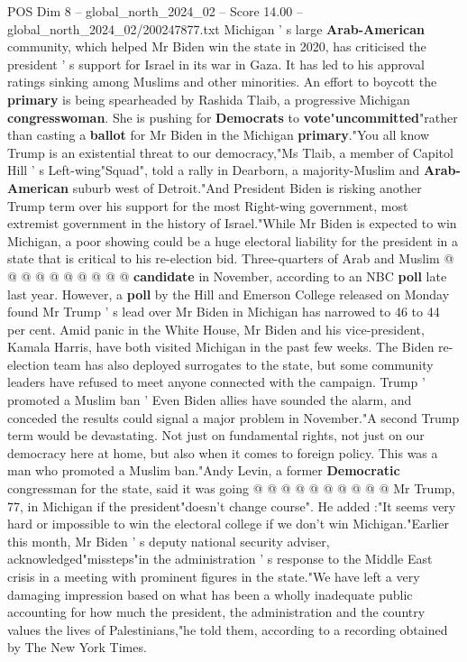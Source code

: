 \begin{textsample}{POS Dim 8 – global\_north\_2024\_02 – Score 14.00 – global\_north\_2024\_02/200247877.txt}  \label{ex:f8_pos_027}
Michigan ' s large \textbf{Arab-American} community, which helped Mr Biden win the state in 2020, has criticised the president ' s support for Israel in its war in Gaza.
It has led to his approval ratings sinking among Muslims and other minorities.
An effort to boycott the \textbf{primary} is being spearheaded by Rashida Tlaib, a progressive Michigan \textbf{congresswoman}.
She is pushing for \textbf{Democrats} to \textbf{vote}"\textbf{uncommitted}"rather than casting a \textbf{ballot} for Mr Biden in the Michigan \textbf{primary}."You all know Trump is an existential threat to our democracy,"Ms Tlaib, a member of Capitol Hill ' s Left-wing"Squad", told a rally in Dearborn, a majority-Muslim and \textbf{Arab-American} suburb west of Detroit."And President Biden is risking another Trump term over his support for the most Right-wing government, most extremist government in the history of Israel."While Mr Biden is expected to win Michigan, a poor showing could be a huge electoral liability for the president in a state that is critical to his re-election bid.
Three-quarters of Arab and Muslim @ @ @ @ @ @ @ @ @ @ \textbf{candidate} in November, according to an NBC \textbf{poll} late last year.
However, a \textbf{poll} by the Hill and Emerson College released on Monday found Mr Trump ' s lead over Mr Biden in Michigan has narrowed to 46 to 44 per cent.
Amid panic in the White House, Mr Biden and his vice-president, Kamala Harris, have both visited Michigan in the past few weeks.
The Biden re-election team has also deployed surrogates to the state, but some community leaders have refused to meet anyone connected with the campaign.
Trump ' promoted a Muslim ban ' Even Biden allies have sounded the alarm, and conceded the results could signal a major problem in November."A second Trump term would be devastating.
Not just on fundamental rights, not just on our democracy here at home, but also when it comes to foreign policy.
This was a man who promoted a Muslim ban."Andy Levin, a former \textbf{Democratic} congressman for the state, said it was going @ @ @ @ @ @ @ @ @ @ Mr Trump, 77, in Michigan if the president"doesn't change course".
He added :"It seems very hard or impossible to win the electoral college if we don't win Michigan."Earlier this month, Mr Biden ' s deputy national security adviser, acknowledged"missteps"in the administration ' s response to the Middle East crisis in a meeting with prominent figures in the state."We have left a very damaging impression based on what has been a wholly inadequate public accounting for how much the president, the administration and the country values the lives of Palestinians,"he told them, according to a recording obtained by The New York Times.

\end{textsample}
